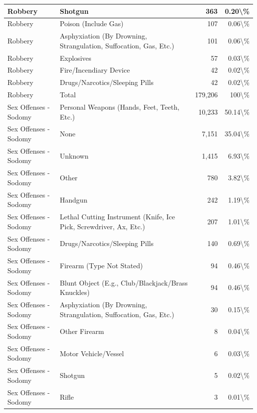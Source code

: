 \documentclass[
]{krantz}
\begin{document}
\begin{longtable}[t]{l|l|r|r}
\hline
Robbery & Shotgun & 363 & 0.20\textbackslash{}\%\\
\hline
Robbery & Poison (Include Gas) & 107 & 0.06\textbackslash{}\%\\
\hline
Robbery & Asphyxiation (By Drowning, Strangulation, Suffocation, Gas, Etc.) & 101 & 0.06\textbackslash{}\%\\
\hline
Robbery & Explosives & 57 & 0.03\textbackslash{}\%\\
\hline
Robbery & Fire/Incendiary Device & 42 & 0.02\textbackslash{}\%\\
\hline
Robbery & Drugs/Narcotics/Sleeping Pills & 42 & 0.02\textbackslash{}\%\\
\hline
Robbery & Total & 179,206 & 100\textbackslash{}\%\\
\hline
Sex Offenses - Sodomy & Personal Weapons (Hands, Feet, Teeth, Etc.) & 10,233 & 50.14\textbackslash{}\%\\
\hline
Sex Offenses - Sodomy & None & 7,151 & 35.04\textbackslash{}\%\\
\hline
Sex Offenses - Sodomy & Unknown & 1,415 & 6.93\textbackslash{}\%\\
\hline
Sex Offenses - Sodomy & Other & 780 & 3.82\textbackslash{}\%\\
\hline
Sex Offenses - Sodomy & Handgun & 242 & 1.19\textbackslash{}\%\\
\hline
Sex Offenses - Sodomy & Lethal Cutting Instrument (Knife, Ice Pick, Screwdriver, Ax, Etc.) & 207 & 1.01\textbackslash{}\%\\
\hline
Sex Offenses - Sodomy & Drugs/Narcotics/Sleeping Pills & 140 & 0.69\textbackslash{}\%\\
\hline
Sex Offenses - Sodomy & Firearm (Type Not Stated) & 94 & 0.46\textbackslash{}\%\\
\hline
Sex Offenses - Sodomy & Blunt Object (E.g., Club/Blackjack/Brass Knuckles) & 94 & 0.46\textbackslash{}\%\\
\hline
Sex Offenses - Sodomy & Asphyxiation (By Drowning, Strangulation, Suffocation, Gas, Etc.) & 30 & 0.15\textbackslash{}\%\\
\hline
Sex Offenses - Sodomy & Other Firearm & 8 & 0.04\textbackslash{}\%\\
\hline
Sex Offenses - Sodomy & Motor Vehicle/Vessel & 6 & 0.03\textbackslash{}\%\\
\hline
Sex Offenses - Sodomy & Shotgun & 5 & 0.02\textbackslash{}\%\\
\hline
Sex Offenses - Sodomy & Rifle & 3 & 0.01\textbackslash{}\%\\

\end{longtable}
\end{document}
